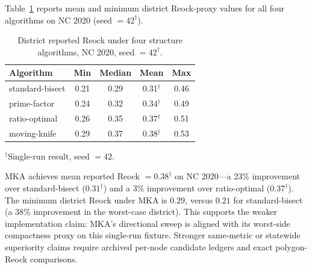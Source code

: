 Table~\ref{tab:mka_reock} reports mean and minimum district Reock-proxy values
for all four algorithms on NC 2020 (seed $= 42^\dagger$).

\begin{table}[ht]
\centering
\caption{District reported Reock under four structure algorithms, NC 2020, seed $= 42^\dagger$.}
\label{tab:mka_reock}
\begin{tabular}{lcccc}
\toprule
Algorithm & Min & Median & Mean & Max \\
\midrule
standard-bisect & 0.21 & 0.29 & 0.31$^\dagger$ & 0.46 \\
prime-factor    & 0.24 & 0.32 & 0.34$^\dagger$ & 0.49 \\
ratio-optimal   & 0.26 & 0.35 & 0.37$^\dagger$ & 0.51 \\
moving-knife    & 0.29 & 0.37 & 0.38$^\dagger$ & 0.53 \\
\bottomrule
\end{tabular}
\begin{tablenotes}
\footnotesize
\item $^\dagger$Single-run result, seed $= 42$.
\end{tablenotes}
\end{table}

MKA achieves mean reported Reock $= 0.38^\dagger$ on NC 2020---a 23\% improvement over
standard-bisect ($0.31^\dagger$) and a 3\% improvement over ratio-optimal ($0.37^\dagger$).
The minimum district Reock under MKA is $0.29$, versus $0.21$ for standard-bisect
(a 38\% improvement in the worst-case district).
This supports the weaker implementation claim: MKA's directional sweep is aligned
with its worst-side compactness proxy on this single-run fixture.  Stronger
same-metric or statewide superiority claims require archived per-node candidate
ledgers and exact polygon-Reock comparisons.
